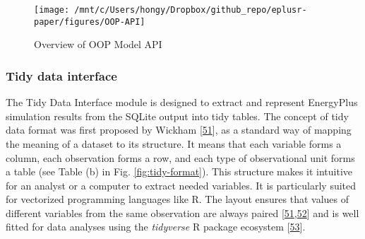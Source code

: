 \documentclass[3p, times]{elsarticle} %
\begin{document}
\begin{figure}[!htb]
\texttt{[image: /mnt/c/Users/hongy/Dropbox/github\_repo/eplusr-paper/figures/OOP-API]} \caption{Overview of OOP Model API}\label{fig:oop-api}
\end{figure}

\hypertarget{sec:eplusr-tidy}{%
\subsubsection{Tidy data interface}\label{sec:eplusr-tidy}}

The Tidy Data Interface module is designed to extract and represent EnergyPlus
simulation results from the SQLite output into tidy tables. The concept of tidy
data format was first proposed by Wickham {[}\protect\hyperlink{ref-Wickham2014}{51}{]}, as a standard way of
mapping the meaning of a dataset to its structure. It means that each variable
forms a column, each observation forms a row, and each type of observational
unit forms a table (see Table (b) in Fig. \ref{fig:tidy-format}). This
structure makes it intuitive for an analyst or a computer to extract needed
variables. It is particularly suited for vectorized programming languages like
R. The layout ensures that values of different variables from the same
observation are always paired {[}\protect\hyperlink{ref-Wickham2014}{51},\protect\hyperlink{ref-Wickham2017}{52}{]} and is well fitted
for data analyses using the \emph{tidyverse} R package ecosystem {[}\protect\hyperlink{ref-Wickham2019}{53}{]}.
\end{document}

